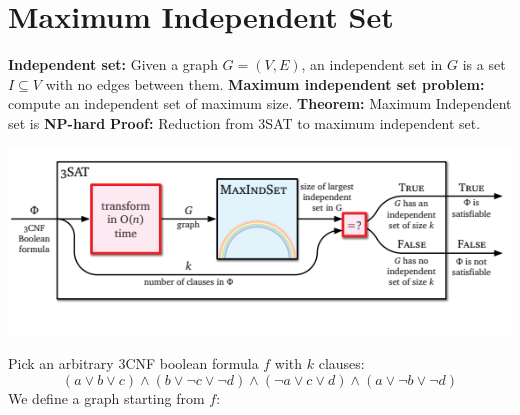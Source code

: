 \section{Maximum Independent Set}
\textbf{Independent set:}
 Given a graph $G=(V,E)$, an independent set in $G$ is a set $I \subseteq V$ with no edges between them.\newline\newline
\textbf{Maximum independent set problem:} compute an independent set of maximum size.\newline\newline
\textbf{Theorem:} Maximum Independent set is \textbf{NP-hard}\newline\newline
\textbf{Proof:}\newline
Reduction from 3SAT to maximum independent set. 
\begin{center}
    \includegraphics[]{images/Reduction max ind set.png}
\end{center}
Pick an arbitrary 3CNF boolean formula $f$ with $k$ clauses:
\[(a \lor b \lor c) \land (b \lor \neg{c} \lor \neg{d}) \land (\neg{a} \lor c \lor d) \land (a \lor \neg{b} \lor \neg{d})\]
We define a graph starting from $f$:
